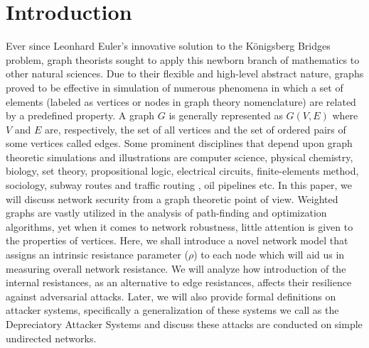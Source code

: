 \documentclass{article}
\begin{document}
	\section{Introduction}
	Ever since Leonhard Euler's innovative solution to the K\"{o}nigsberg Bridges problem, graph theorists sought to apply this newborn branch of mathematics to other natural sciences. Due to their flexible and high-level abstract nature, graphs proved to be effective in simulation of numerous phenomena in which a set of elements (labeled as vertices or nodes in graph theory nomenclature) are related by a predefined property\cite{tucker2012applied}. A graph $G$ is generally represented as $G(V,E)$ where $V$ and $E$ are, respectively, the set of all vertices and the set of ordered pairs of some vertices called edges. Some prominent disciplines that depend upon graph theoretic simulations and illustrations are computer science, physical chemistry\cite{klein1993m}, biology\cite{mason2007graph}\cite{knisley2014vertex}, set theory, propositional logic, electrical circuits, finite-elements method, sociology, subway routes and traffic routing \cite{guze4805898continuous}, oil pipelines etc. In this paper, we will discuss network security from a graph theoretic point of view. Weighted graphs are vastly utilized in the analysis of path-finding and optimization algorithms, yet when it comes to network robustness, little attention is given to the properties of vertices. Here, we shall introduce a novel network model that assigns an intrinsic resistance parameter ($\rho$) to each node which will aid us in measuring overall network resistance. We will analyze how introduction of the internal resistances, as an alternative to edge resistances, affects their resilience against adversarial attacks. Later, we will also provide formal definitions on attacker systems, specifically a generalization of these systems we call as the Depreciatory Attacker Systems and discuss these attacks are conducted on simple undirected networks.
	
	
\end{document}
